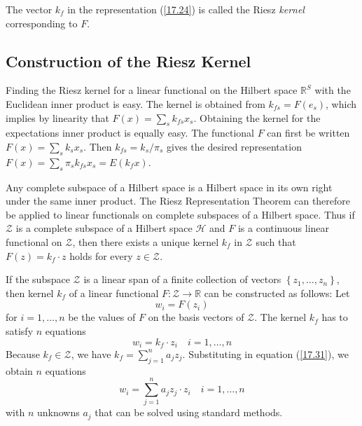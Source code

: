 \documentclass[\topdir/lecture\_notes.tex]{subfiles}
\begin{document}
The vector \(k_{f}\) in the representation (\ref{17.24}) is called the Riesz \emph{kernel} corresponding to \(F\).
\begin{optional}
\subsection{Construction of the Riesz Kernel}
Finding the Riesz kernel for a linear functional on the Hilbert space \(\mathbb{R}^{S}\) with the Euclidean inner product is easy. The kernel is obtained from \(k_{f s}=F\left(e_{s}\right)\), which implies by linearity that \(F(x)=\sum_{s} k_{f s} x_{s}\). Obtaining the kernel for the expectations inner product is equally easy. The functional \(F\) can first be written \(F(x)=\sum_{s} k_{s} x_{s}\). Then \(k_{f s}=k_{s} / \pi_{s}\) gives the desired representation \(F(x)=\sum_{s} \pi_{s} k_{f s} x_{s}=E\left(k_{f} x\right)\).

Any complete subspace of a Hilbert space is a Hilbert space in its own right under the same inner product. The Riesz Representation Theorem can therefore be applied to linear functionals on complete subspaces of a Hilbert space. Thus if \(\mathcal{Z}\) is a complete subspace of a Hilbert space \(\mathcal{H}\) and \(F\) is a continuous linear functional on \(\mathcal{Z}\), then there exists a unique kernel \(k_{f}\) in \(\mathcal{Z}\) such that \(F(z)=k_{f} \cdot z\) holds for every \(z \in \mathcal{Z}\).

If the subspace \(\mathcal{Z}\) is a linear span of a finite collection of vectors \(\left\{z_{1}, \ldots, z_{n}\right\}\), then kernel \(k_{f}\) of a linear functional \(F: \mathcal{Z} \rightarrow \mathbb{R}\) can be constructed as follows: Let
\begin{equation*}
w_{i}=F\left(z_{i}\right) 
\end{equation*}
for \(i=1, \ldots, n\) be the values of \(F\) on the basis vectors of \(\mathcal{Z}\). The kernel \(k_{f}\) has to satisfy \(n\) equations
\begin{equation}
w_{i}=k_{f} \cdot z_{i} \quad i=1, \ldots, n \label{17.31}
\end{equation}
Because \(k_{f} \in \mathcal{Z}\), we have \(k_{f}=\sum_{j=1}^{n} a_{j} z_{j}\). Substituting in equation (\ref{17.31}), we obtain \(n\) equations
\begin{equation*}
w_{i}=\sum_{j=1}^{n} a_{j} z_{j} \cdot z_{i} \quad i=1, \ldots, n 
\end{equation*}
with \(n\) unknowns \(a_{j}\) that can be solved using standard methods.


\end{optional}
\end{document}
